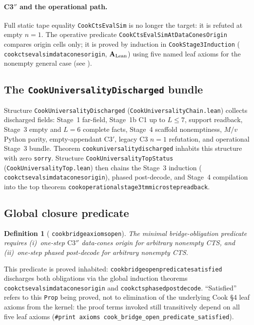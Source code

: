 \documentclass[11pt]{article}
\newtheorem{definition}[theorem]{Definition}
\theoremstyle{remark}
\newcommand{\CatAL}{\ensuremath{\textbf{A}_{\rm Lean}}}
\newcommand{\lean}[1]{%
  \penalty-100
  \begingroup\def\_{\textunderscore\allowbreak}\texttt{#1}\endgroup}
\begin{document}
\paragraph{C3$''$ and the operational path.}
Full static tape equality \texttt{CookCtsEvalSim} is no longer the target: it is refuted at empty $n{=}1$.
The operative predicate \texttt{CookCtsEvalSimAtDataConesOrigin} compares origin cells only; it is
proved by induction in \texttt{CookStage3Induction} (\lean{cook\_cts\_eval\_sim\_data\_cones\_origin},
$\CatAL$) using five named leaf axioms for the nonempty general case (see ).

\subsection{The \texttt{CookUniversalityDischarged} bundle}

Structure \lean{CookUniversalityDischarged} (\texttt{CookUniversalityChain.lean}) collects
discharged fields: Stage~1 far-field, Stage~1b C1 up to $L \le 7$, support readback,
Stage~3 empty and $L{=}6$ complete facts, Stage~4 scaffold nonemptiness, $M/v$ Python parity,
empty-appendant C3$'$, legacy C3 $n{=}1$ refutation, and operational Stage~3 bundle.
Theorem \lean{cook\_universality\_discharged} inhabits this structure with zero \texttt{sorry}.
Structure \lean{CookUniversalityTopStatus} (\texttt{CookUniversalityTop.lean}) then chains
the Stage~3 induction (\lean{cook\_cts\_eval\_sim\_data\_cones\_origin}), phased post-decode, and
Stage~4 compilation into the top theorem \lean{cook\_operational\_stage3\_tm\_microstep\_readback}.

\subsection{Global closure predicate}

\begin{definition}[\lean{cook\_bridge\_axioms\_open}]
The minimal bridge-obligation predicate requires (i)~one-step $\mathrm{C3}''$ data-cones
origin for arbitrary nonempty CTS, and (ii)~one-step phased post-decode for arbitrary
nonempty CTS.
\end{definition}

This predicate is proved inhabited: \lean{cook\_bridge\_open\_predicate\_satisfied} discharges
both obligations via the global induction theorems \lean{cook\_cts\_eval\_sim\_data\_cones\_origin}
and \lean{cook\_cts\_phased\_post\_decode}.  ``Satisfied'' refers to this \texttt{Prop} being
proved, not to elimination of the underlying Cook \S4 leaf axioms from the kernel: the proof
terms invoked still transitively depend on all five leaf axioms
(\texttt{\#print axioms cook\_bridge\_open\_predicate\_satisfied}).
\end{document}
